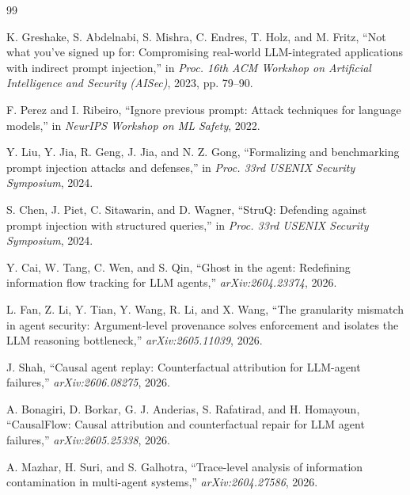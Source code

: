 \documentclass[10pt,twocolumn,a4paper]{article}
\begin{document}
\begin{thebibliography}{99}
\footnotesize

K. Greshake, S. Abdelnabi, S. Mishra, C. Endres, T. Holz, and M. Fritz,
``Not what you've signed up for: Compromising real-world LLM-integrated
applications with indirect prompt injection,'' in \emph{Proc. 16th ACM Workshop
on Artificial Intelligence and Security (AISec)}, 2023, pp. 79--90.

F. Perez and I. Ribeiro, ``Ignore previous prompt: Attack techniques for
language models,'' in \emph{NeurIPS Workshop on ML Safety}, 2022.

Y. Liu, Y. Jia, R. Geng, J. Jia, and N. Z. Gong, ``Formalizing and benchmarking
prompt injection attacks and defenses,'' in \emph{Proc. 33rd USENIX Security
Symposium}, 2024.

S. Chen, J. Piet, C. Sitawarin, and D. Wagner, ``StruQ: Defending against
prompt injection with structured queries,'' in \emph{Proc. 33rd USENIX Security
Symposium}, 2024.

Y. Cai, W. Tang, C. Wen, and S. Qin, ``Ghost in the agent: Redefining
information flow tracking for LLM agents,'' \emph{arXiv:2604.23374}, 2026.

L. Fan, Z. Li, Y. Tian, Y. Wang, R. Li, and X. Wang, ``The granularity mismatch
in agent security: Argument-level provenance solves enforcement and isolates
the LLM reasoning bottleneck,'' \emph{arXiv:2605.11039}, 2026.

J. Shah, ``Causal agent replay: Counterfactual attribution for LLM-agent
failures,'' \emph{arXiv:2606.08275}, 2026.

A. Bonagiri, D. Borkar, G. J. Anderias, S. Rafatirad, and H. Homayoun,
``CausalFlow: Causal attribution and counterfactual repair for LLM agent
failures,'' \emph{arXiv:2605.25338}, 2026.

A. Mazhar, H. Suri, and S. Galhotra, ``Trace-level analysis of information
contamination in multi-agent systems,'' \emph{arXiv:2604.27586}, 2026.


\end{thebibliography}
\end{document}
